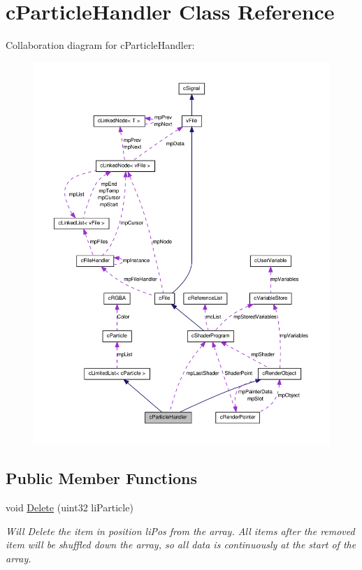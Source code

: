 \hypertarget{classc_particle_handler}{
\section{cParticleHandler Class Reference}
\label{classc_particle_handler}
}


Collaboration diagram for cParticleHandler:\nopagebreak
\begin{figure}[H]
\begin{center}
\leavevmode
\includegraphics[width=400pt]{classc_particle_handler__coll__graph}
\end{center}
\end{figure}
\subsection*{Public Member Functions}
\begin{DoxyCompactItemize}
\item 
\hypertarget{classc_particle_handler_ada64d26bf581756c5ecba3a480e678e5}{
void \hyperlink{classc_particle_handler_ada64d26bf581756c5ecba3a480e678e5}{Delete} (uint32 liParticle)}
\label{classc_particle_handler_ada64d26bf581756c5ecba3a480e678e5}

\begin{DoxyCompactList}\small\item\em Will Delete the item in position liPos from the array. All items after the removed item will be shuffled down the array, so all data is continuously at the start of the array. \end{DoxyCompactList}\end{DoxyCompactItemize}
